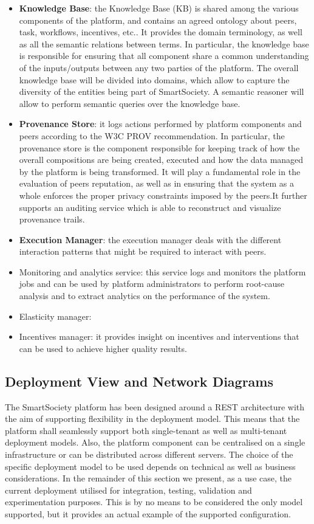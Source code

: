 \begin{itemize}
\item \textbf{Knowledge Base}: the Knowledge Base (KB) is shared among the various components of the platform, and contains an agreed ontology about peers, task, workflows, incentives, etc.. It provides the domain terminology, as well as all the semantic relations between terms. In particular, the knowledge base is responsible for ensuring that all component share a common understanding of the inputs/outputs between any two parties of the platform.
The overall knowledge base will be divided into domains, which allow to capture the diversity of the entities being part of SmartSociety. A semantic reasoner will allow to perform semantic queries over the knowledge base.

\item \textbf{Provenance Store}: it logs actions performed by platform
components and peers according to the W3C PROV recommendation. In particular, the provenance store is the component responsible for keeping track of how the overall compositions are being created, executed and how the data managed by the platform is being transformed. It will play a fundamental role in the evaluation of peers reputation, as well as in ensuring that the system as a whole enforces the proper privacy constraints imposed by the peers.It further supports an auditing service which is able to reconstruct and visualize provenance trails. 
\item \textbf{Execution Manager}: the execution manager deals with the different interaction patterns that might be required to interact with peers.
\item Monitoring and analytics service: this service logs and monitors
the platform jobs and can be used by platform administrators to
perform root-cause analysis and to extract analytics on the
performance of the system. 
\item Elasticity manager:

\item Incentives manager: it provides insight on incentives and
interventions that can be used to achieve higher quality results.
\end{itemize} 	


\subsection{Deployment View and Network Diagrams}
The SmartSociety platform has been designed around a REST architecture
with the aim of supporting flexibility in the deployment model. This
means that the platform shall seamlessly support both single-tenant as
well as multi-tenant deployment models. Also, the platform component
can be centralised on a single infrastructure or can be distributed
across different servers. The choice of the specific deployment model
to be used depends on technical as well as business considerations. In
the remainder of this section we present, as a use case, the current
deployment utilised for integration, testing, validation and
experimentation purposes. This is by no means to be considered the
only model supported, but it provides an actual example of the
supported configuration. 

